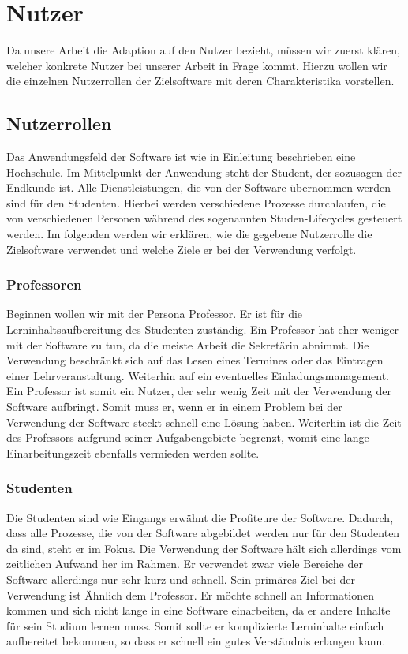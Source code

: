 \chapter{Nutzer}
Da unsere Arbeit die Adaption auf den Nutzer bezieht, müssen wir zuerst klären, welcher konkrete Nutzer bei unserer Arbeit in Frage kommt. Hierzu wollen wir die einzelnen Nutzerrollen der Zielsoftware mit deren Charakteristika vorstellen.


\section{Nutzerrollen}
Das Anwendungsfeld der Software ist wie in Einleitung beschrieben eine Hochschule. Im Mittelpunkt der Anwendung steht der Student, der sozusagen der Endkunde ist. Alle Dienstleistungen, die von der Software übernommen werden sind für den Studenten. Hierbei werden verschiedene Prozesse durchlaufen, die von verschiedenen Personen während des sogenannten Studen-Lifecycles gesteuert werden. Im folgenden werden wir erklären, wie die gegebene Nutzerrolle die Zielsoftware verwendet und welche Ziele er bei der Verwendung verfolgt.
\subsection{Professoren}
Beginnen wollen wir mit der Persona Professor. Er ist für die Lerninhaltsaufbereitung des Studenten zuständig. Ein Professor hat eher weniger mit der Software zu tun, da die meiste Arbeit die Sekretärin abnimmt. Die Verwendung beschränkt sich auf das Lesen eines Termines oder das Eintragen einer Lehrveranstaltung. Weiterhin auf ein eventuelles Einladungsmanagement. Ein Professor ist somit ein Nutzer, der sehr wenig Zeit mit der Verwendung der Software aufbringt. Somit muss er, wenn er in einem Problem bei der Verwendung der Software steckt schnell eine Lösung haben. Weiterhin ist die Zeit des Professors aufgrund seiner Aufgabengebiete begrenzt, womit eine lange Einarbeitungszeit ebenfalls vermieden werden sollte.
\subsection{Studenten}
Die Studenten sind wie Eingangs erwähnt die Profiteure der Software. Dadurch, dass alle Prozesse, die von der Software abgebildet werden nur für den Studenten da sind, steht er im Fokus. Die Verwendung der Software hält sich allerdings vom zeitlichen Aufwand her im Rahmen. Er verwendet zwar viele Bereiche der Software allerdings nur sehr kurz und schnell. Sein primäres Ziel bei der Verwendung ist Ähnlich dem Professor. Er möchte schnell an Informationen kommen und sich nicht lange in eine Software einarbeiten, da er andere Inhalte für sein Studium lernen muss. Somit sollte er komplizierte Lerninhalte einfach aufbereitet bekommen, so dass er schnell ein gutes Verständnis erlangen kann.

